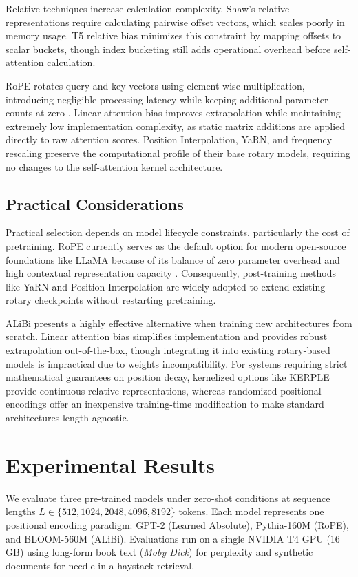 \documentclass[conference]{IEEEtran}
\begin{document}
Relative techniques increase calculation complexity. Shaw's relative representations require calculating pairwise offset vectors, which scales poorly in memory usage. T5 relative bias minimizes this constraint by mapping offsets to scalar buckets, though index bucketing still adds operational overhead before self-attention calculation.

RoPE rotates query and key vectors using element-wise multiplication, introducing negligible processing latency while keeping additional parameter counts at zero \cite{su2024roformer}. Linear attention bias improves extrapolation while maintaining extremely low implementation complexity, as static matrix additions are applied directly to raw attention scores. Position Interpolation, YaRN, and frequency rescaling preserve the computational profile of their base rotary models, requiring no changes to the self-attention kernel architecture.

\subsection{Practical Considerations}

Practical selection depends on model lifecycle constraints, particularly the cost of pretraining. RoPE currently serves as the default option for modern open-source foundations like LLaMA because of its balance of zero parameter overhead and high contextual representation capacity \cite{touvron2023}. Consequently, post-training methods like YaRN and Position Interpolation are widely adopted to extend existing rotary checkpoints without restarting pretraining.

ALiBi presents a highly effective alternative when training new architectures from scratch. Linear attention bias simplifies implementation and provides robust extrapolation out-of-the-box, though integrating it into existing rotary-based models is impractical due to weights incompatibility. For systems requiring strict mathematical guarantees on position decay, kernelized options like KERPLE provide continuous relative representations, whereas randomized positional encodings offer an inexpensive training-time modification to make standard architectures length-agnostic.

\section{Experimental Results}
\label{sec:results}

We evaluate three pre-trained models under zero-shot conditions at sequence lengths $L \in \{512, 1024, 2048, 4096, 8192\}$ tokens. Each model represents one positional encoding paradigm: GPT-2 (Learned Absolute), Pythia-160M (RoPE), and BLOOM-560M (ALiBi). Evaluations run on a single NVIDIA T4 GPU (16\,GB) using long-form book text (\emph{Moby Dick}) for perplexity and synthetic documents for needle-in-a-haystack retrieval.
\end{document}
